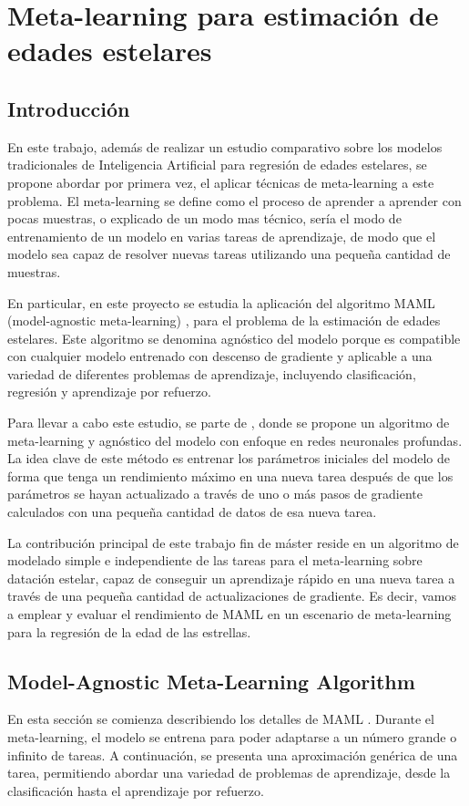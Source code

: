\chapter{Meta-learning para estimación de edades estelares}

\section{Introducción}

En este trabajo, además de realizar un estudio comparativo sobre los modelos tradicionales de Inteligencia Artificial para regresión de edades estelares, se propone abordar por primera vez, el aplicar técnicas de meta-learning a este problema. El meta-learning se define como el proceso de aprender a aprender con pocas muestras, o explicado de un modo mas técnico, sería el modo de entrenamiento de un modelo en varias tareas de aprendizaje, de modo que el modelo sea capaz de resolver nuevas tareas utilizando una pequeña cantidad de muestras. 

En particular, en este proyecto se estudia la aplicación del algoritmo MAML (model-agnostic meta-learning) \cite{finn2017modelagnostic}, para el problema de la estimación de edades estelares. Este algoritmo se denomina agnóstico del modelo porque es compatible con cualquier modelo entrenado con descenso de gradiente y aplicable a una variedad de diferentes problemas de aprendizaje, incluyendo clasificación, regresión y aprendizaje por refuerzo. 

Para llevar a cabo este estudio, se parte de \cite{finn2017modelagnostic}, donde se propone un algoritmo de meta-learning y agnóstico del modelo con enfoque en redes neuronales profundas. La idea clave de este método es entrenar los parámetros iniciales del modelo de forma que tenga un rendimiento máximo en una nueva tarea después de que los parámetros se hayan actualizado a través de uno o más pasos de gradiente calculados con una pequeña cantidad de datos de esa nueva tarea.

La contribución principal de este trabajo fin de máster reside en un algoritmo de modelado simple e independiente de las tareas para el meta-learning sobre datación estelar, capaz de conseguir un aprendizaje rápido en una nueva tarea a través de una pequeña cantidad de actualizaciones de gradiente. Es decir, vamos a emplear y evaluar el rendimiento de MAML en un escenario de meta-learning para la regresión de la edad de las estrellas. 

\section{Model-Agnostic Meta-Learning Algorithm}
\label{sec:metalearning}
En esta sección se comienza describiendo los detalles de MAML \cite{finn2017modelagnostic}. Durante el meta-learning, el modelo se entrena para poder adaptarse a un número grande o infinito de tareas. A continuación, se presenta una aproximación genérica de una tarea, permitiendo abordar una variedad de problemas de aprendizaje, desde la clasificación hasta el aprendizaje por refuerzo.

